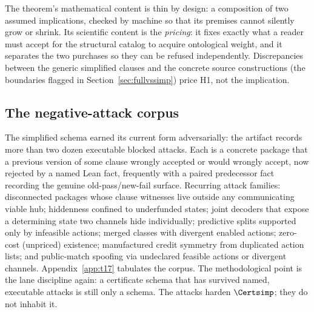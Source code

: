 The theorem's mathematical content is thin by design: a
composition of two assumed implications, checked by machine so that its
premises cannot silently grow or shrink. Its scientific content is the
\emph{pricing}: it fixes exactly what a reader must accept for the structural
catalog to acquire ontological weight, and it separates the two purchases so
they can be refused independently. Discrepancies between the generic
simplified clauses and the concrete source constructions (the boundaries
flagged in Section~\ref{sec:fullvssimp}) price H1, not the implication.

\subsection{The negative-attack corpus}

The simplified schema earned its current form adversarially: the artifact
records more than two dozen executable blocked attacks. Each is a concrete
package that a previous version of some clause wrongly accepted or would
wrongly accept, now rejected by a named Lean fact, frequently with a paired
predecessor fact recording the genuine old-pass/new-fail surface. Recurring
attack families: disconnected packages whose clause witnesses live outside
any communicating viable hub; hiddenness confined to underfunded states;
joint decoders that expose a determining state two channels hide
individually; predictive splits supported only by infeasible actions; merged
classes with divergent enabled actions; zero-cost (unpriced) existence;
manufactured credit symmetry from duplicated action lists; and
public-match spoofing via undeclared feasible actions or divergent channels.
Appendix~\ref{app:t17} tabulates the corpus. The methodological point is the
lane discipline again: a certificate schema that has survived named,
executable attacks is still only a schema. The attacks harden $\Certsimp$;
they do not inhabit it.

